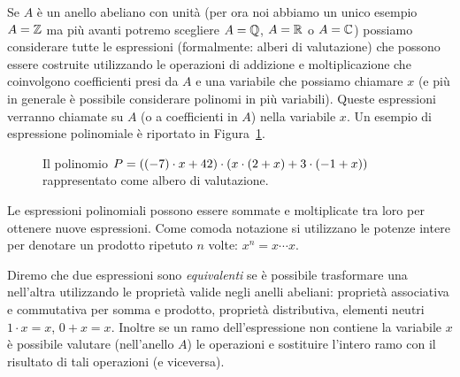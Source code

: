 Se $A$ è un anello abeliano con unità 
(per ora noi abbiamo un unico esempio $A={\mathbb Z}$ ma più avanti potremo scegliere 
$A={\mathbb Q}$, $A={\mathbb R}$ o $A={\mathbb C}$)
possiamo considerare tutte le espressioni
(formalmente: alberi di valutazione)
che possono essere costruite utilizzando le operazioni
di addizione e moltiplicazione che coinvolgono coefficienti presi da $A$
e una variabile che possiamo chiamare $x$ 
(e più in generale è possibile considerare polinomi in più variabili).
Queste espressioni verranno chiamate  su $A$
(o a coefficienti in $A$) nella variabile $x$. 
Un esempio di espressione polinomiale
è riportato in Figura~\ref{fig:49389}.
\begin{figure}
\begin{center}
\end{center}
\caption{Il polinomio $P = {\left( (-7)\cdot x + 42 \right)}\cdot(x\cdot (2+x) + 3\cdot(-1+x))$
rappresentato come albero di valutazione.}
\label{fig:49389}%
\end{figure}
Le espressioni polinomiali possono essere sommate e moltiplicate tra loro 
per ottenere nuove espressioni. 
Come comoda notazione si utilizzano le potenze intere per 
denotare un prodotto ripetuto $n$ volte: $x^n = x\cdots x$.

Diremo che due espressioni sono \emph{equivalenti} se è possibile trasformare 
una nell'altra utilizzando le proprietà valide negli anelli abeliani: 
proprietà associativa 
e commutativa per somma e prodotto, proprietà distributiva, elementi 
neutri $1\cdot x = x$, $0 + x = x$.
Inoltre se un ramo dell'espressione non contiene la variabile $x$ è possibile valutare 
(nell'anello $A$) le operazioni e sostituire l'intero ramo con il 
risultato di tali operazioni (e viceversa).

